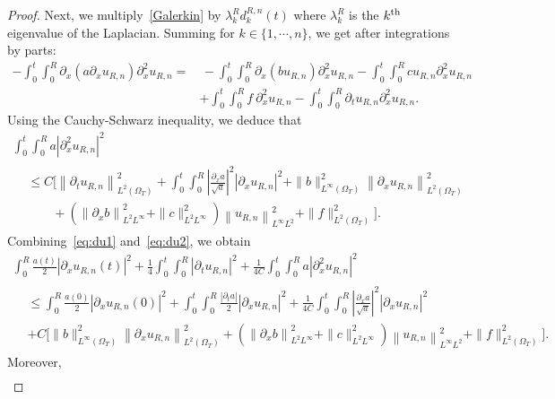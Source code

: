 \documentclass[10pt]{amsart}
\theoremstyle{definition}\newtheorem{defi}[theo]{Definition}\newtheorem{rema}[theo]{Remark}\newtheorem{exam}[theo]{Example}\newtheorem{exem}[theo]{Example}\newtheorem{nota}[theo]{Notation}
\begin{document}
\begin{proof}
Next, we multiply~\eqref{Galerkin} by $\lambda^R_k d^{R,n}_k(t)$ where $\lambda^R_k$ is the $k^{\rm th}$ eigenvalue of the Laplacian. Summing for $k\in \{1,\cdots, n\}$, we get after integrations by parts:
\begin{align*}
- \int_0^t \int_0^R \partial_x(a\partial_x u_{R,n}) \partial^2_x u_{R,n}  =&\, - \int_0^t \int_0^R \partial_x(bu_{R,n}) \partial^2_x u_{R,n} - \int_0^t\int_0^Rcu_{R,n} \partial^2_x u_{R,n} \\
& + \int_0^t\int_0^R f \ \partial^2_x u_{R,n} - \int_0^t\int_0^R \partial_t u_{R,n} \partial^2_x u_{R,n}. 
\end{align*}
Using the Cauchy-Schwarz inequality, we deduce that
\begin{multline}\label{eq:du2}
\int_0^t \int_0^R a \left|\partial^2_x u_{R,n}\right|^2 \\
\begin{aligned}
& \leq {C} \Big[\left\|\partial_t u_{R,n}\right\|_{L^2(\Omega_T)}^2 + \int_0^t\int_0^R \left|\frac{\partial_x a}{\sqrt{a}}\right|^2 \left|\partial_x u_{R,n}\right|^2 + \|b\|_{L^\infty(\Omega_T)}^2 \left\|\partial_x u_{R,n}\right\|_{L^2(\Omega_T)}^2 \\
& \qquad +\left(\left\|\partial_x b\right\|_{L^2 L^\infty}^2 + \|c\|_{L^2 L^\infty}^2\right) \left\|u_{R,n}\right\|_{L^\infty L^2}^2 + \|f\|_{L^2(\Omega_T)}^2
\Big].
\end{aligned}
\end{multline}
Combining~\eqref{eq:du1} and~\eqref{eq:du2}, we obtain
\begin{multline*}
 \int_0^R \frac{a(t)}{2} \left|\partial_x u_{R,n}(t)\right|^2 + \frac{1}{4} \int_0^t \int_0^R \left|\partial_t u_{R,n}\right|^2 + \frac{1}{4{C}}\int_0^t \int_0^R a \left|\partial^2_x u_{R,n}\right|^2  \\
\begin{aligned}
&\leq \int_0^R \frac{a(0)}{2} \left|\partial_x u_{R,n}(0)\right|^2 + \int_0^t \int_0^R \frac{|\partial_t a|}{2} \left|\partial_x u_{R,n}\right|^2 + \frac{1}{4{C}}\int_0^t\int_0^R \left|\frac{\partial_x a}{\sqrt{a}}\right|^2 \left|\partial_x u_{R,n}\right|^2 \\
&+ C \Big[
\|b\|_{L^\infty(\Omega_T)}^2 \left\|\partial_x u_{R,n}\right\|_{L^2(\Omega_T)}^2 +\left(\left\|\partial_x b\right\|_{L^2 L^\infty}^2 + \|c\|_{L^2 L^\infty}^2\right) \left\|u_{R,n}\right\|_{L^\infty L^2}^2 + \|f\|_{L^2(\Omega_T)}^2 \Big].
\end{aligned}
\end{multline*}
Moreover,
\begin{align*}

\end{align*}
\end{proof}
\end{document}
